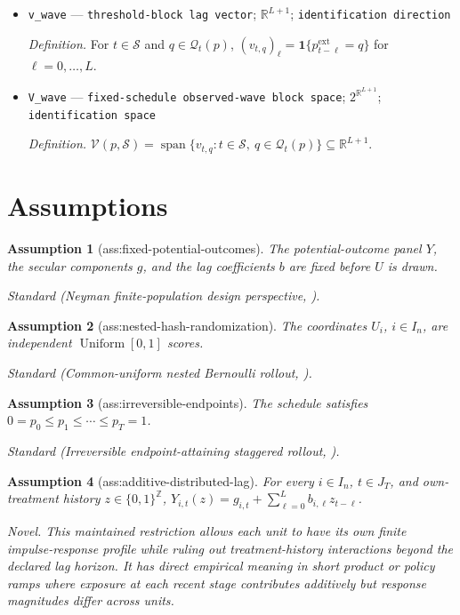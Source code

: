 \documentclass{article}
\newtheorem{assumption}{Assumption}
\begin{document}
\begin{itemize}
  \item \texttt{v\_\allowbreak{}wave} --- \texttt{threshold-\allowbreak{}block lag vector}; \(\mathbb R^{L+1}\); \texttt{identification direction}
  \par\smallskip\noindent\emph{Definition.} For \(t\in\mathcal S\) and \(q\in\mathcal Q_t(p)\), \((v_{t,q})_\ell=\mathbf 1\{p^{\mathrm{ext}}_{t-\ell}=q\}\) for \(\ell=0,\ldots,L\).
  \item \texttt{V\_\allowbreak{}wave} --- \texttt{fixed-\allowbreak{}schedule observed-\allowbreak{}wave block space}; \(2^{\mathbb R^{L+1}}\); \texttt{identification space}
  \par\smallskip\noindent\emph{Definition.} \(\mathcal V(p,\mathcal S)=\operatorname{span}\{v_{t,q}:t\in\mathcal S,\ q\in\mathcal Q_t(p)\}\subseteq\mathbb R^{L+1}\).
\end{itemize}

\section{Assumptions}

\begin{assumption}[ass:fixed-potential-outcomes]\label{ass:fixed-potential-outcomes}
The potential-outcome panel \(Y\), the secular components \(g\), and the lag coefficients \(b\) are fixed before \(U\) is drawn.
\par\smallskip\noindent\emph{Standard} (Neyman finite-population design perspective, \cite{AtheyImbens2022}).
\end{assumption}

\begin{assumption}[ass:nested-hash-randomization]\label{ass:nested-hash-randomization}
The coordinates \(U_i\), \(i\in I_n\), are independent \(\operatorname{Uniform}[0,1]\) scores.
\par\smallskip\noindent\emph{Standard} (Common-uniform nested Bernoulli rollout, \cite{CortezEichhornYu2022}).
\end{assumption}

\begin{assumption}[ass:irreversible-endpoints]\label{ass:irreversible-endpoints}
The schedule satisfies \(0=p_0\le p_1\le\cdots\le p_T=1\).
\par\smallskip\noindent\emph{Standard} (Irreversible endpoint-attaining staggered rollout, \cite{XiongAtheyBayatiImbens2023}).
\end{assumption}

\begin{assumption}[ass:additive-distributed-lag]\label{ass:additive-distributed-lag}
For every \(i\in I_n\), \(t\in J_T\), and own-treatment history \(z\in\{0,1\}^{\mathbb Z}\), \(Y_{i,t}(z)=g_{i,t}+\sum_{\ell=0}^{L}b_{i,\ell}z_{t-\ell}\).
\par\smallskip\noindent\emph{Novel.} This maintained restriction allows each unit to have its own finite impulse-response profile while ruling out treatment-history interactions beyond the declared lag horizon. It has direct empirical meaning in short product or policy ramps where exposure at each recent stage contributes additively but response magnitudes differ across units.
\end{assumption}
\end{document}
